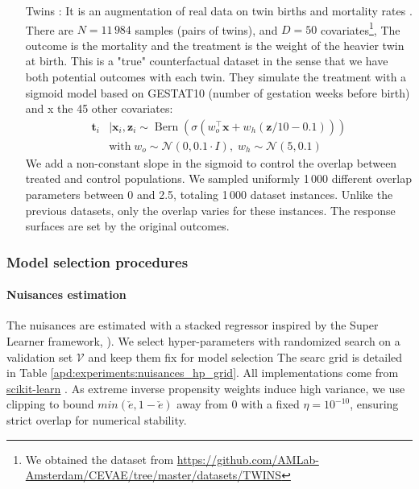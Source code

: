 \documentclass[a4paper,num-refs]{oup-contemporary}%
\begin{document}
\begin{itemize}
    \item[Twins] \cite{louizos_causal_2017}: It is an augmentation of
          real data on twin births and mortality rates
          \cite{almond_costs_2005}. There are $N=11\,984$ samples (pairs of twins),
          and $D=50$ covariates\footnote{We obtained the dataset from
              \href{https://github.com/AMLab-Amsterdam/CEVAE/tree/master/datasets/TWINS}{https://github.com/AMLab-Amsterdam/CEVAE/tree/master/datasets/TWINS}}, The outcome is the mortality and the treatment is the
          weight of the heavier twin at birth. This is a "true" counterfactual dataset
          \cite{curth_really_2021} in the sense that we have
          both potential outcomes with each twin. They simulate the treatment with a
          sigmoid model based on GESTAT10 (number of gestation weeks before birth) and x
          the 45 other covariates:
          \begin{align}
              \mathbf{t}_{i} & \mid \mathbf{x}_{i}, \mathbf{z}_{i} \sim
              \operatorname{Bern}\left(\sigma\left(w_{o}^{\top}
              \mathbf{x}+w_{h}(\mathbf{z} / 10-0.1)\right)\right)       \\ & \text{with} \;
              w_{o} \sim \mathcal{N}(0,0.1 \cdot I),\; w_{h} \sim \mathcal{N}(5,0.1) \nonumber
          \end{align}
          We add a non-constant slope in the
          sigmoid to control the overlap between
          treated and control populations.
          We sampled uniformly 1\,000 different overlap parameters between 0 and
          2.5, totaling 1\,000 dataset instances. Unlike the previous datasets,
          only the overlap varies for these instances. The response surfaces are
          set by the original outcomes.
\end{itemize}

\subsubsection{Model selection procedures}

\paragraph{Nuisances estimation}\label{apd:experiments:nuisances_hp}

The nuisances are estimated with a stacked regressor inspired by the Super
Learner framework, \cite{laan_super_2007}). We select hyper-parameters
with randomized search on a validation set $\mathcal{V}$ and keep them fix for
model selection  The searc grid is detailed in Table
\ref{apd:experiments:nuisances_hp_grid}. All implementations come from
\href{https://scikit-learn.org/stable/}{scikit-learn}
\cite{pedregosa_scikitlearn_2011}.  As extreme inverse propensity weights induce
high variance, we use clipping \cite{swaminathan_counterfactual_2015,
    ionides_truncated_2008} to bound $min(\check e, 1-\check e)$ away from 0 with a
fixed $\eta=10^{-10}$, ensuring strict overlap for numerical stability.
\end{document}
